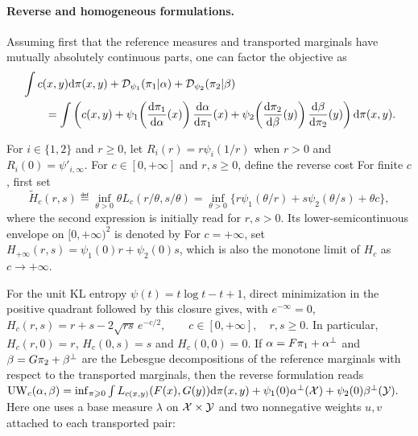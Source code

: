 \paragraph{Reverse and homogeneous formulations.}
Assuming first that the reference measures and transported marginals have mutually absolutely continuous parts, one can factor the objective as
\begin{align*}
&\int c(x,y)\mathrm{d}\pi(x,y)
+\mathcal{D}_{\psi_1}(\pi_1|\alpha)+\mathcal{D}_{\psi_2}(\pi_2|\beta) \\
&\qquad =
\int
\left(
c(x,y)
+
\psi_1\!\left(\frac{\mathrm{d}\pi_1}{\mathrm{d}\alpha}(x)\right)\frac{\mathrm{d}\alpha}{\mathrm{d}\pi_1}(x)
+
\psi_2\!\left(\frac{\mathrm{d}\pi_2}{\mathrm{d}\beta}(y)\right)\frac{\mathrm{d}\beta}{\mathrm{d}\pi_2}(y)
\right)
\mathrm{d}\pi(x,y).
\end{align*}
\begin{defn}\label{def-unbalanced-local-costs}
For $i\in\{1,2\}$ and $r\geq0$, let $R_i(r)=r\psi_i(1/r)$ when $r>0$ and $R_i(0)=\psi'_{i,\infty}$. For $c\in[0,+\infty]$ and $r,s\geq0$, define the reverse cost
For finite $c$, first set
\[
\widetilde H_c(r,s)
\eqdef
\inf_{\theta>0}\theta L_c(r/\theta,s/\theta)
=
\inf_{\theta>0}
\bigl\{r\psi_1(\theta/r)+s\psi_2(\theta/s)+\theta c\bigr\},
\]
where the second expression is initially read for $r,s>0$. Its lower-semicontinuous envelope on $[0,+\infty)^2$ is denoted by
For $c=+\infty$, set $H_{+\infty}(r,s)=\psi_1(0)r+\psi_2(0)s$, which is also the monotone limit of $H_c$ as $c\to+\infty$.
\end{defn}
For the unit KL entropy $\psi(t)=t\log t-t+1$, direct minimization in the positive quadrant followed by this closure gives, with $e^{-\infty}=0$, \(H_c(r,s)=r+s-2\sqrt{rs}\,e^{-c/2}, \qquad c\in[0,+\infty],\quad r,s\geq0.\)
In particular, $H_c(r,0)=r$, $H_c(0,s)=s$ and $H_c(0,0)=0$. If $\alpha=F\pi_1+\alpha^\perp$ and $\beta=G\pi_2+\beta^\perp$ are the Lebesgue decompositions of the reference marginals with respect to the transported marginals, then the reverse formulation reads
\(\operatorname{UW}_c(\alpha,\beta) = \inf_{\pi\geqslant0} \int L_{c(x,y)}(F(x),G(y))\mathrm{d}\pi(x,y) + \psi_1(0)\alpha^\perp(\mathcal{X}) + \psi_2(0)\beta^\perp(\mathcal{Y}).\)
Here one uses a base measure $\lambda$ on $\mathcal{X}\times\mathcal{Y}$ and two nonnegative weights $u,v$ attached to each transported pair:
